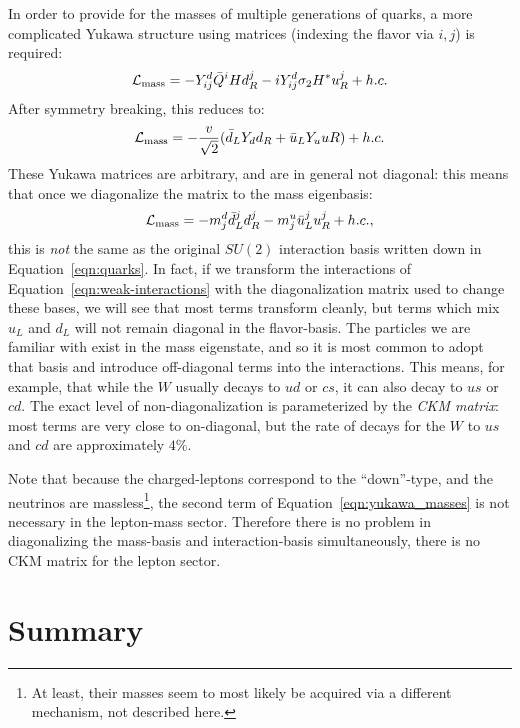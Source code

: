 In order to provide for the masses of multiple generations of quarks, a more complicated Yukawa structure using matrices (indexing the flavor via $i,j$) is required:
%
\begin{equation}
\label{eqn:yukawa_masses}
\mathcal{L}_\mathrm{mass} = -Y_{ij}^d \bar{Q}^i H d_R^j - i Y_{ij}^d \sigma_2 H^* u_R^j + h.c.
\end{equation}
%
After symmetry breaking, this reduces to:
%
\begin{equation}
\mathcal{L}_\mathrm{mass} = - \frac{v}{\sqrt{2}} (\bar{d}_L Y_d d_R + \bar{u}_L Y_u uR) + h.c.
\end{equation}
%
These Yukawa matrices are arbitrary, and are in general not diagonal: this means that once we diagonalize the matrix to the mass eigenbasis:
%
\begin{equation}
\mathcal{L}_\mathrm{mass} = - m_j^d \bar{d}^j_L d^j_R - m_j^u \bar{u}_L^j u^j_R + h.c.,
\end{equation}
%
this is \textit{not} the same as the original $SU(2)$ interaction basis written down in Equation~\ref{eqn:quarks}. In fact, if we transform the interactions of Equation~\ref{eqn:weak-interactions} with the diagonalization matrix used to change these bases, we will see that most terms transform cleanly, but terms which mix $u_L$ and $d_L$ will not remain diagonal in the flavor-basis. The particles we are familiar with exist in the mass eigenstate, and so it is most common to adopt that basis and introduce off-diagonal terms into the interactions. This means, for example, that while the $W$ usually decays to $ud$ or $cs$, it can also decay to $us$ or $cd$. The exact level of non-diagonalization is parameterized by the \textit{CKM matrix}: most terms are very close to on-diagonal, but the rate of decays for the $W$ to $us$ and $cd$ are approximately $4\%$.

Note that because the charged-leptons correspond to the ``down''-type, and the neutrinos are massless\footnote{At least, their masses seem to most likely be acquired via a different mechanism, not described here.}, the second term of Equation~\ref{eqn:yukawa_masses} is not necessary in the lepton-mass sector. Therefore there is no problem in diagonalizing the mass-basis and interaction-basis simultaneously, there is no CKM matrix for the lepton sector.


\section{Summary}


